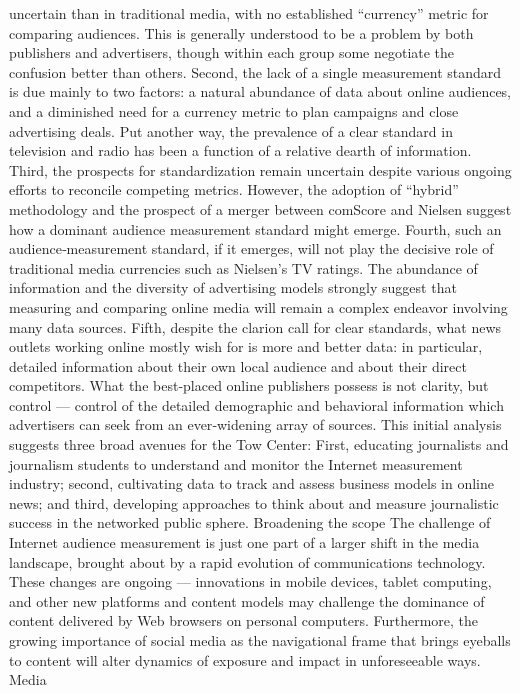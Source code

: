 uncertain than in traditional media, with no established ``currency'' metric
for comparing audiences. This is generally understood to be a problem by
both publishers and advertisers, though within each group some negotiate
the confusion better than others.
Second, the lack of a single measurement standard is due mainly to two
factors: a natural abundance of data about online audiences, and a
diminished need for a currency metric to plan campaigns and close
advertising deals. Put another way, the prevalence of a clear standard in
television and radio has been a function of a relative dearth of
information.
Third, the prospects for standardization remain uncertain despite various
ongoing efforts to reconcile competing metrics. However, the adoption of
``hybrid'' methodology and the prospect of a merger between comScore
and Nielsen suggest how a dominant audience measurement standard
might emerge.
Fourth, such an audience‐measurement standard, if it emerges, will not
play the decisive role of traditional media currencies such as Nielsen’s TV
ratings. The abundance of information and the diversity of advertising
models strongly suggest that measuring and comparing online media will
remain a complex endeavor involving many data sources.
Fifth, despite the clarion call for clear standards, what news outlets
working online mostly wish for is more and better data: in particular,
detailed information about their own local audience and about their direct
competitors. What the best‐placed online publishers possess is not clarity,
but control — control of the detailed demographic and behavioral
information which advertisers can seek from an ever‐widening array of
sources.
This initial analysis suggests three broad avenues for the Tow Center:
First, educating journalists and journalism students to understand and
monitor the Internet measurement industry; second, cultivating data to
track and assess business models in online news; and third, developing
approaches to think about and measure journalistic success in the
networked public sphere.
Broadening the scope
The challenge of Internet audience measurement is just one part of a
larger shift in the media landscape, brought about by a rapid evolution of
communications technology. These changes are ongoing — innovations in
mobile devices, tablet computing, and other new platforms and content
models may challenge the dominance of content delivered by Web
browsers on personal computers. Furthermore, the growing importance of
social media as the navigational frame that brings eyeballs to content will
alter dynamics of exposure and impact in unforeseeable ways. Media
